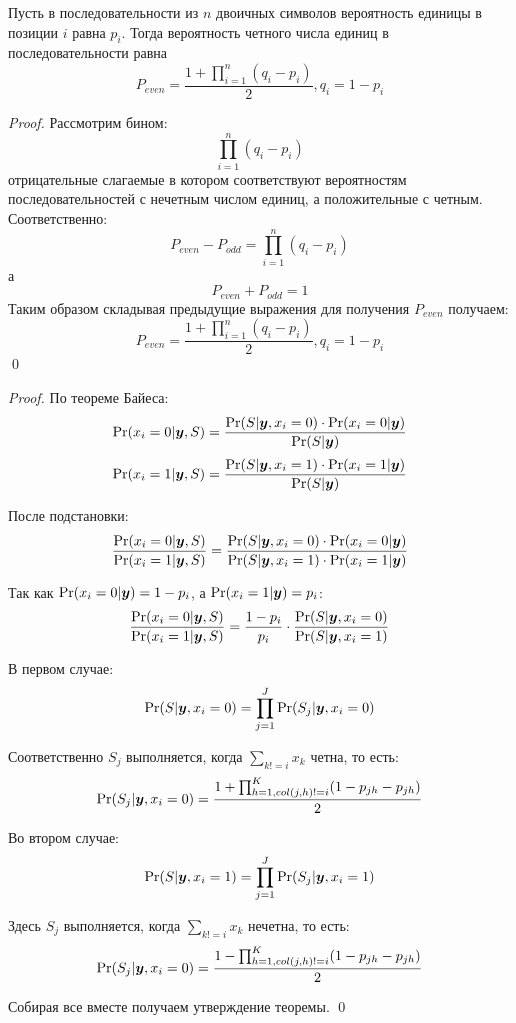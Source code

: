 \begin{lemma}
	\cite{kudryashov-codingtheory}
	Пусть в последовательности из $n$ двоичных символов вероятность единицы в позиции $i$ равна $p_i$.
	Тогда вероятность четного числа единиц в последовательности равна
	\begin{equation}
		P_{even}=\frac{1+\prod_{i=1}^n(q_i-p_i)}{2}, q_i=1-p_i
	\end{equation}
\end{lemma}
\begin{proof}
	Рассмотрим бином:
	\[
		\prod_{i=1}^n(q_i-p_i)
	\]
	отрицательные слагаемые в котором соответствуют вероятностям последовательностей с нечетным
	числом единиц, а положительные с четным. Соответственно:
	\[
	P_{even} - P_{odd} = \prod_{i=1}^n(q_i-p_i)
	\]
	а
	\[
	P_{even} + P_{odd} = 1
	\]
	Таким образом складывая предыдущие выражения для получения $P_{even}$ получаем:
	\[
		P_{even}=\frac{1+\prod_{i=1}^n(q_i-p_i)}{2}, q_i=1-p_i
	\]
	\qed
\end{proof}

\begin{proof}
	По теореме Байеса:
	\begin{equation}
		\Pr(x_i=0|\boldsymbol{y},S)=\frac{\Pr(S|\boldsymbol{y},x_i=0) \cdot \Pr(x_i=0|\boldsymbol{y})}{\Pr(S|\boldsymbol{y})}
	\end{equation}
	\begin{equation}
		\Pr(x_i=1|\boldsymbol{y},S)=\frac{\Pr(S|\boldsymbol{y},x_i=1) \cdot \Pr(x_i=1|\boldsymbol{y})}{\Pr(S|\boldsymbol{y})}
	\end{equation}
	
	После подстановки:
	\begin{equation}
		\frac{\Pr(x_i=0|\boldsymbol{y},S)}{\Pr(x_i=1|\boldsymbol{y},S)}=\frac{\Pr(S|\boldsymbol{y},x_i=0) \cdot \Pr(x_i=0|\boldsymbol{y})}{\Pr(S|\boldsymbol{y},x_i=1) \cdot \Pr(x_i=1|\boldsymbol{y})}
	\end{equation}
	
	Так как $\Pr(x_i=0|\boldsymbol{y})=1-p_i$, а $\Pr(x_i=1|\boldsymbol{y})=p_i$:
	\begin{equation}
		\frac{\Pr(x_i=0|\boldsymbol{y},S)}{\Pr(x_i=1|\boldsymbol{y},S)}=\frac{1-p_i}{p_i} \cdot 
		\frac{\Pr(S|\boldsymbol{y},x_i=0)}{\Pr(S|\boldsymbol{y},x_i=1)}
	\end{equation}
	
	В первом случае:
	\begin{equation}
		\Pr(S|\boldsymbol{y},x_i=0)=\prod_{j=1}^J \Pr(S_j|\boldsymbol{y},x_i=0)
	\end{equation}
	
	Соответственно $S_j$ выполняется, когда $\sum_{k!=i}x_k$ четна, то есть:
	\[
	\Pr(S_j|\boldsymbol{y},x_i=0)=\frac{1+\prod_{h=1, col(j,h)!=i}^K(1-p_{jh}-p_{jh})}{2}
	\]
	
	Во втором случае:
	\begin{equation}
		\Pr(S|\boldsymbol{y},x_i=1)=\prod_{j=1}^J \Pr(S_j|\boldsymbol{y},x_i=1)
	\end{equation}
	
	Здесь $S_j$ выполняется, когда $\sum_{k!=i}x_k$ нечетна, то есть:
	\[
	\Pr(S_j|\boldsymbol{y},x_i=0)=\frac{1-\prod_{h=1, col(j,h)!=i}^K(1-p_{jh}-p_{jh})}{2}
	\]
	
	Собирая все вместе получаем утверждение теоремы. \qed
\end{proof}

